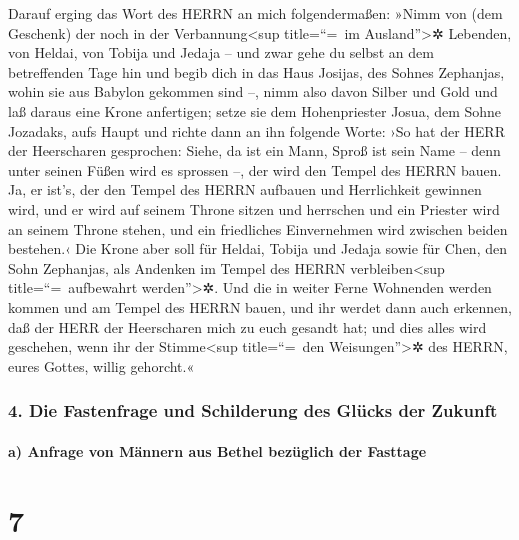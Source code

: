  Darauf erging das Wort des HERRN an mich folgendermaßen:
 »Nimm von (dem Geschenk) der noch in der
Verbannung\textless sup title=``=~im Ausland''\textgreater✲ Lebenden,
von Heldai, von Tobija und Jedaja -- und zwar gehe du selbst an dem
betreffenden Tage hin und begib dich in das Haus Josijas, des Sohnes
Zephanjas, wohin sie aus Babylon gekommen sind --,  nimm
also davon Silber und Gold und laß daraus eine Krone anfertigen; setze
sie dem Hohenpriester Josua, dem Sohne Jozadaks, aufs Haupt
 und richte dann an ihn folgende Worte: ›So hat der HERR
der Heerscharen gesprochen: Siehe, da ist ein Mann, Sproß ist sein Name
-- denn unter seinen Füßen wird es sprossen --, der wird den Tempel des
HERRN bauen.  Ja, er ist's, der den Tempel des HERRN
aufbauen und Herrlichkeit gewinnen wird, und er wird auf seinem Throne
sitzen und herrschen und ein Priester wird an seinem Throne stehen, und
ein friedliches Einvernehmen wird zwischen beiden bestehen.‹
 Die Krone aber soll für Heldai, Tobija und Jedaja sowie
für Chen, den Sohn Zephanjas, als Andenken im Tempel des HERRN
verbleiben\textless sup title=``=~aufbewahrt werden''\textgreater✲.
 Und die in weiter Ferne Wohnenden werden kommen und am
Tempel des HERRN bauen, und ihr werdet dann auch erkennen, daß der HERR
der Heerscharen mich zu euch gesandt hat; und dies alles wird geschehen,
wenn ihr der Stimme\textless sup title=``=~den Weisungen''\textgreater✲
des HERRN, eures Gottes, willig gehorcht.«

\hypertarget{die-fastenfrage-und-schilderung-des-gluxfccks-der-zukunft}{%
\subsubsection{4. Die Fastenfrage und Schilderung des Glücks der
Zukunft}\label{die-fastenfrage-und-schilderung-des-gluxfccks-der-zukunft}}

\hypertarget{a-anfrage-von-muxe4nnern-aus-bethel-bezuxfcglich-der-fasttage}{%
\paragraph{a) Anfrage von Männern aus Bethel bezüglich der
Fasttage}\label{a-anfrage-von-muxe4nnern-aus-bethel-bezuxfcglich-der-fasttage}}

\hypertarget{section-6}{%
\section{7}\label{section-6}}


